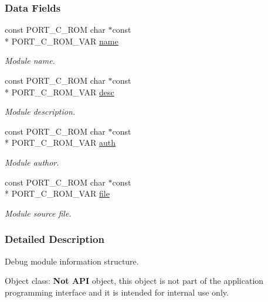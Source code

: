 \subsubsection*{Data Fields}
\begin{DoxyCompactItemize}
\item 
const P\-O\-R\-T\-\_\-\-C\-\_\-\-R\-O\-M char $\ast$const \\*
P\-O\-R\-T\-\_\-\-C\-\_\-\-R\-O\-M\-\_\-\-V\-A\-R \hyperlink{structdbgCobj___1_1dbgModInfo___a1f1e63081ea74aa9cf12aad803004a20}{name}
\begin{DoxyCompactList}\small\item\em Module name. \end{DoxyCompactList}\item 
const P\-O\-R\-T\-\_\-\-C\-\_\-\-R\-O\-M char $\ast$const \\*
P\-O\-R\-T\-\_\-\-C\-\_\-\-R\-O\-M\-\_\-\-V\-A\-R \hyperlink{structdbgCobj___1_1dbgModInfo___ac296c9d637c9b76a94e6a5034992e894}{desc}
\begin{DoxyCompactList}\small\item\em Module description. \end{DoxyCompactList}\item 
const P\-O\-R\-T\-\_\-\-C\-\_\-\-R\-O\-M char $\ast$const \\*
P\-O\-R\-T\-\_\-\-C\-\_\-\-R\-O\-M\-\_\-\-V\-A\-R \hyperlink{structdbgCobj___1_1dbgModInfo___ac60151ee24fcc0df692a7408b5acc731}{auth}
\begin{DoxyCompactList}\small\item\em Module author. \end{DoxyCompactList}\item 
const P\-O\-R\-T\-\_\-\-C\-\_\-\-R\-O\-M char $\ast$const \\*
P\-O\-R\-T\-\_\-\-C\-\_\-\-R\-O\-M\-\_\-\-V\-A\-R \hyperlink{structdbgCobj___1_1dbgModInfo___ac3336d552e586c2d91a044ccdcc40764}{file}
\begin{DoxyCompactList}\small\item\em Module source file. \end{DoxyCompactList}\end{DoxyCompactItemize}


\subsubsection{Detailed Description}
Debug module information structure. 

\begin{DoxyParagraph}{Object class\-:}
{\bfseries Not A\-P\-I} object, this object is not part of the application programming interface and it is intended for internal use only. 
\end{DoxyParagraph}


